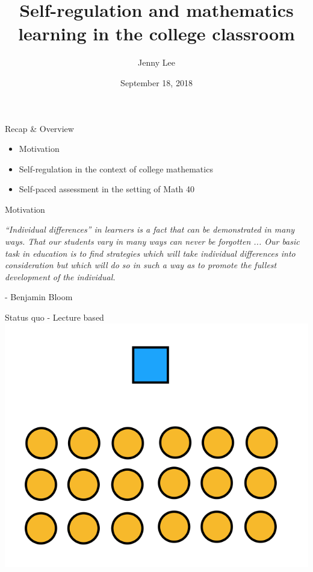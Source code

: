 \documentclass{beamer}
\title{Self-regulation and mathematics learning in the college classroom}
\date{September 18, 2018}
\author{Jenny Lee}
\institute{Harvey Mudd College\\Advisor: Dagan Karp}
\begin{document}
\maketitle
\begin{frame}{Recap \& Overview}
  \begin{itemize}
    \item Motivation
    \item Self-regulation in the context of college mathematics
    \item Self-paced assessment in the setting of Math 40
  \end{itemize}
\end{frame}
\begin{frame}{Motivation}
  \begin{center}
    \textit{``Individual differences'' in learners is a fact that can be demonstrated in many ways. That our students { {\color{blue}}{vary in many ways}} can never be forgotten ... Our basic task in education is to find strategies which will take individual differences into consideration but which will do so in such a way as to { {\color{blue}} promote the fullest development of the individual}.}
  \end{center}
  \hfill- Benjamin Bloom
\end{frame}
\begin{frame}{Status quo - Lecture based}
  \centering
    \includegraphics[scale=0.5]{lecturestyle1}
\end{frame}
\end{document}
